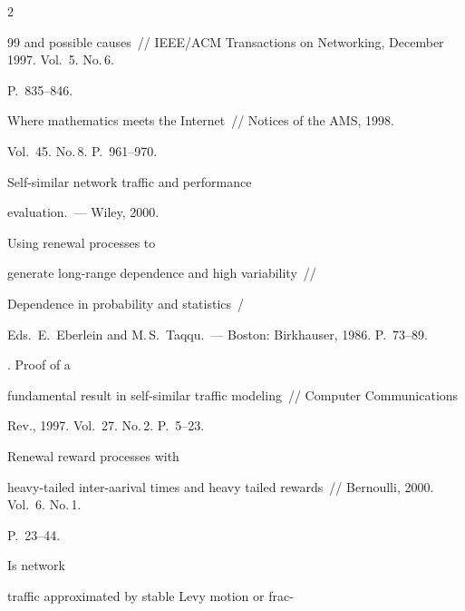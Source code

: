 \begin{multicols}{2}
{{\begin{thebibliography}{99}
and possible  causes~// IEEE/ACM Transactions on Networking, December 1997. Vol.~5. No.\,6. 

P.~835--846. 






 Where mathematics meets the Internet~// Notices of the AMS, 1998. 

Vol.~45. No.\,8. P.~961--970.  




 Self-similar network traffic and performance 

evaluation.~--- Wiley, 2000. 




 Using renewal processes to

generate long-range dependence and high variability~// 

Dependence in probability and statistics~/

Eds.\ E.~Eberlein and M.\,S.~Taqqu.~---  Boston: Birkhauser, 1986.  P.~73--89. 




. Proof of a

fundamental result in self-similar traffic modeling~// Computer Communications

Rev., 1997. Vol.~27. No.\,2. P.~5--23. 




 Renewal reward processes with

heavy-tailed inter-aarival times and heavy tailed rewards~// Bernoulli, 2000. Vol.~6. No.\,1. 

P.~23--44. 




 Is network

traffic approximated by stable Levy motion or frac-\linebreak\vspace*{-12pt}



\columnbreak




\end{thebibliography}}}
\end{multicols}

